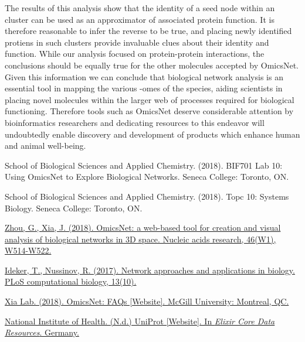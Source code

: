 \documentclass[letterpaper, 10 pt, conference]{ieeeconf}  %
\begin{document}
The results of this analysis show that the identity of a seed node within an cluster can be used as an approximator of associated protein function. It is therefore reasonable to infer the reverse to be true, and placing newly identified protiens in such clusters provide invaluable clues about their identity and function. While our analysis focused on protein-protein interactions, the conclusions should be equally true for the other molecules accepted by OmicsNet. Given this information we can conclude that biological network analysis is an essential tool in mapping the various -omes of the species, aiding scientists in placing novel molecules within the larger web of processes required for biological functioning. Therefore tools such as OmicsNet deserve considerable attention by bioinformatics researchers and dedicating resources to this endeavor will undoubtedly enable discovery and development of products which enhance human and animal well-being.

\addtolength{\textheight}{-12cm}  %


\begin{thebibliography}{99}

 School of Biological Sciences and Applied Chemistry. (2018). BIF701 Lab 10: Using OmicsNet to Explore Biological Networks. Seneca College: Toronto, ON.

 School of Biological Sciences and Applied Chemistry. (2018). Topc 10: Systems Biology. Seneca College: Toronto, ON.

 \href{https://dx.doi.org/10.1093%2Fnar%2Fgky510}{Zhou, G., Xia, J. (2018). OmicsNet: a web-based tool for creation and visual analysis of biological networks in 3D space. Nucleic acids research, 46(W1), W514-W522.}

 \href{https://dx.doi.org/10.1371%2Fjournal.pcbi.1005771}{Ideker, T., Nussinov, R. (2017). Network approaches and applications in biology. PLoS computational biology, 13(10).}

 \href{https://www.omicsnet.ca/faces/docs/FaqView.xhtml}{Xia Lab. (2018). OmicsNet: FAQs [Website]. McGill University: Montreal, QC.}

 \href{https://www.uniprot.org/}{National Institute of Health. (N.d.) UniProt [Website]. In \emph{Elixir Core Data Resources}. Germany.}

\end{thebibliography}
\end{document}
